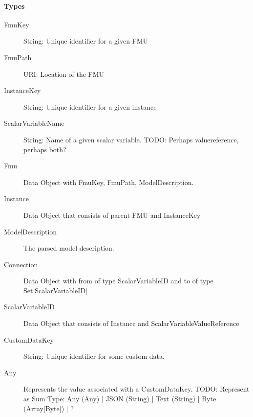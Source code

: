 \paragraph{Types}
\begin{description}
  \item[FmuKey] String: Unique identifier for a given FMU
  \item[FmuPath] URI: Location of the FMU
  \item[InstanceKey] String: Unique identifier for a given instance
  \item[ScalarVariableName] String: Name of a given scalar variable.
    TODO: Perhaps valuereference, perhaps both?
  \item[Fmu] Data Object with FmuKey, FmuPath, ModelDescription.
  \item[Instance] Data Object that consists of parent FMU and InstanceKey
  \item[ModelDescription] The parsed model description.
  \item[Connection] Data Object with from of type ScalarVariableID and to of type Set[ScalarVariableID]
  \item[ScalarVariableID] Data Object that consists of Instance and ScalarVariableValueReference
  \item[CustomDataKey] String: Unique identifier for some custom data.
  \item[Any] Represents the value associated with a CustomDataKey.
    TODO: Represent as Sum Type: Any (Any) | JSON (String) | Text (String) |
    Byte (Array[Byte]) | ?
\end{description}

